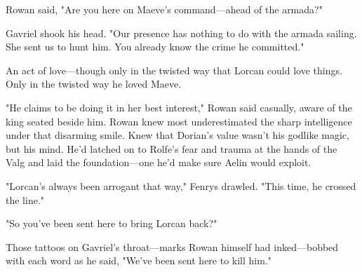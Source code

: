 Rowan said, "Are you here on Maeve's command---ahead of the armada?"

Gavriel shook his head. "Our presence has nothing to do with the armada sailing. She sent us to hunt him. You already know the crime he committed."

An act of love---though only in the twisted way that Lorcan could love things. Only in the twisted way he loved Maeve.

"He claims to be doing it in her best interest," Rowan said casually, aware of the king seated beside him. Rowan knew most underestimated the sharp intelligence under that disarming smile. Knew that Dorian's value wasn't his godlike magic, but his mind. He'd latched on to Rolfe's fear and trauma at the hands of the Valg and laid the foundation---one he'd make sure Aelin would exploit.

"Lorcan's always been arrogant that way," Fenrys drawled. "This time, he crossed the line."

"So you've been sent here to bring Lorcan back?"

Those tattoos on Gavriel's throat---marks Rowan himself had inked---bobbed with each word as he said, "We've been sent here to kill him."
